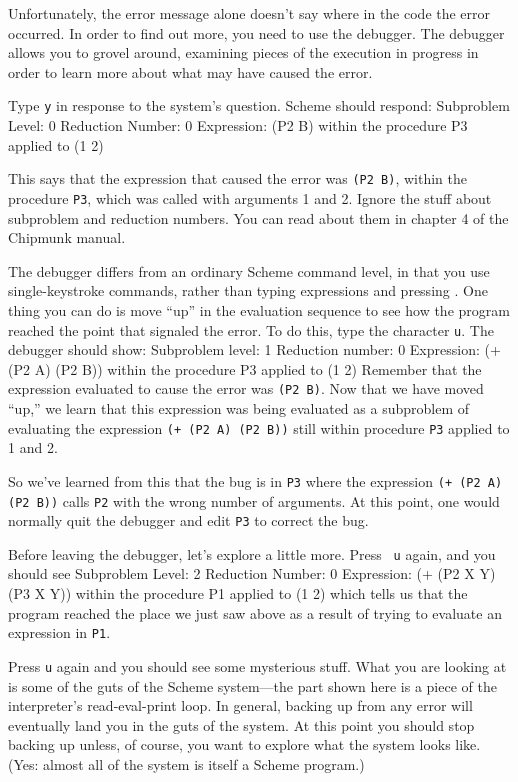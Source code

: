 Unfortunately, the error message alone doesn't say where in the code
the error occurred.  In order to find out more, you need to use the
debugger.  The debugger allows you to grovel around, examining pieces
of the execution in progress in order to learn more about what may
have caused the error.

Type {\tt y} in response to the system's question.
Scheme should respond:
\beginlisp
Subproblem Level: 0  Reduction Number: 0
Expression:
(P2 B)
within the procedure P3
applied to (1 2)
\endlisp

This says that the expression that caused the error was {\tt (P2 B)},
within the procedure {\tt P3}, which was called with arguments 1 and
2.  Ignore the stuff about subproblem and reduction numbers.  You can
read about them in chapter 4 of the Chipmunk manual.

The debugger differs from an ordinary Scheme command level, in that you use
single-keystroke commands, rather than typing expressions and pressing
.  One thing you can do is move ``up'' in the evaluation sequence
to see how the program reached the point that signaled the error.  To do this,
type the character {\tt u}.  The debugger should show:
\beginlisp
Subproblem level: 1 Reduction number: 0
Expression:
(+ (P2 A) (P2 B))
within the procedure P3
applied to (1 2)
\endlisp
Remember that the expression evaluated to cause the error was {\tt (P2
B)}.  Now that we have moved ``up,'' we learn that this expression was
being evaluated as a subproblem of evaluating the expression {\tt (+
(P2 A) (P2 B))} still within procedure {\tt P3} applied to 1 and 2.

So we've learned from this that the bug is in {\tt P3} where the
expression {\tt (+ (P2 A) (P2 B))} calls {\tt P2} with the wrong
number of arguments.  At this point, one would normally quit the
debugger and edit {\tt P3} to correct the bug.

Before leaving the debugger, let's explore a little more.  Press {\tt
u} again, and you should see
\beginlisp
Subproblem Level: 2  Reduction Number: 0
Expression:
(+ (P2 X Y) (P3 X Y))
within the procedure P1
applied to (1 2)
\endlisp
which tells us that the program reached the place we just saw above as
a result of trying to evaluate an expression in {\tt P1}.

Press {\tt u} again and you should see some mysterious stuff.  What
you are looking at is some of the guts of the Scheme system---the part
shown here is a piece of the interpreter's read-eval-print loop.
In general, backing up from any error will eventually land you in the
guts of the system.  At this point you should stop backing up unless,
of course, you want to explore what the system looks like.  (Yes:
almost all of the system is itself a Scheme program.)

